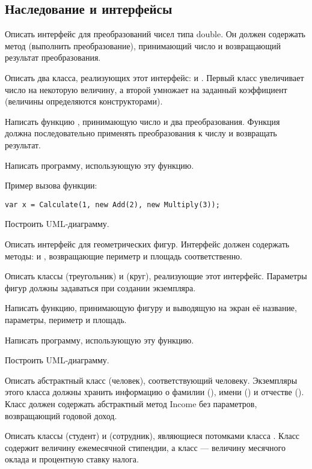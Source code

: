 
\subsection{Наследование и интерфейсы}

\task Описать интерфейс  для преобразований чисел
типа double. Он должен содержать метод  (выполнить
преобразование), принимающий число и возвращающий результат
преобразования.

Описать два класса, реализующих этот интерфейс:  и
. Первый класс увеличивает число на некоторую величину,
а второй умножает на заданный коэффициент (величины определяются
конструкторами).

Написать функцию , принимающую число и два
преобразования. Функция должна последовательно применять
преобразования к числу и возвращать результат.

Написать программу, использующую эту функцию.

Пример вызова функции:
\begin{lstlisting}[numbers=none]
var x = Calculate(1, new Add(2), new Multiply(3));
\end{lstlisting}

Построить UML-диаграмму.

\task Описать интерфейс  для геометрических
фигур. Интерфейс должен содержать методы:  и
, возвращающие периметр и площадь соответственно.

Описать классы  (треугольник) и  (круг),
реализующие этот интерфейс. Параметры фигур должны задаваться при
создании экземпляра.

Написать функцию, принимающую фигуру и выводящую на экран её название,
параметры, периметр и площадь.

Написать программу, использующую эту функцию.

Построить UML-диаграмму.

\task Описать абстрактный класс  (человек),
соответствующий человеку. Экземпляры этого класса должны хранить
информацию о фамилии (), имени () и отчестве
(). Класс должен содержать абстрактный метод Income
без параметров, возвращающий годовой доход.

Описать классы  (студент) и  (сотрудник),
являющиеся потомками класса . Класс  содержит
величину ежемесячной стипендии, а класс  — величину
месячного оклада и процентную ставку налога.

